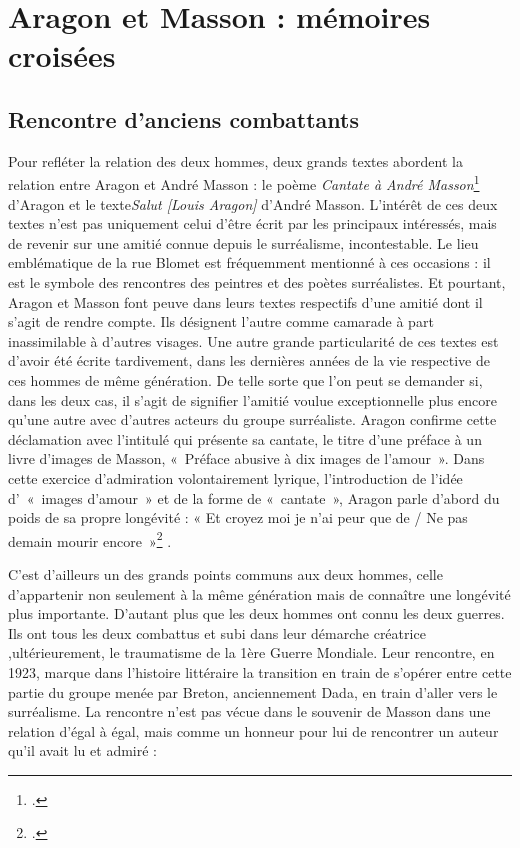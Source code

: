 \chapter{Aragon et Masson : mémoires croisées}
\section{Rencontre d'anciens combattants}
    Pour refléter la relation des deux hommes, deux grands textes abordent la relation entre Aragon et André Masson : le poème  \emph{Cantate à André Masson}\footcite[p681]{ecritssurla} d'Aragon et le texte\emph{Salut [Louis Aragon]} d'André Masson. L’intérêt de ces deux textes n’est pas uniquement celui d’être écrit par les principaux intéressés, mais de revenir sur une amitié connue depuis le surréalisme, incontestable. Le lieu emblématique de la rue Blomet est fréquemment mentionné à ces occasions : il est le symbole des rencontres des peintres et des poètes surréalistes. Et pourtant, Aragon et Masson font peuve dans leurs textes respectifs d'une amitié dont il s'agit de rendre compte. Ils désignent l'autre comme camarade à part inassimilable à d’autres visages. Une autre grande particularité de ces textes est d’avoir été écrite tardivement, dans les dernières années de la vie respective de ces hommes de même génération. De telle sorte que l’on peut se demander si, dans les deux cas, il s’agit de signifier l'amitié voulue exceptionnelle plus encore qu'une autre avec d'autres acteurs du groupe surréaliste. Aragon confirme cette déclamation avec l'intitulé qui présente sa cantate, le titre d'une préface à un livre d’images de Masson, « Préface abusive à dix images de l’amour ». Dans cette exercice d'admiration volontairement lyrique, l'introduction de l’idée d’ « images d’amour » et de la forme de « cantate », Aragon parle d’abord du poids de sa propre longévité : « Et croyez moi je n’ai peur que de / Ne pas demain mourir encore »\footcite[p681]{ecritssurla} .

    C’est d’ailleurs un des grands points communs aux deux hommes, celle d’appartenir non seulement à la même génération mais de connaître une longévité plus importante. D’autant plus que les deux hommes ont connu les deux guerres. Ils ont tous les deux combattus et subi dans leur démarche créatrice ,ultérieurement, le traumatisme de la 1ère Guerre Mondiale. Leur rencontre, en 1923, marque dans l’histoire littéraire la transition en train de s’opérer entre cette partie du groupe menée par Breton, anciennement Dada, en train d’aller vers le surréalisme. La rencontre n’est pas vécue dans le souvenir de Masson dans une relation d’égal à égal, mais comme un honneur pour lui de rencontrer un auteur qu’il avait lu et admiré :

